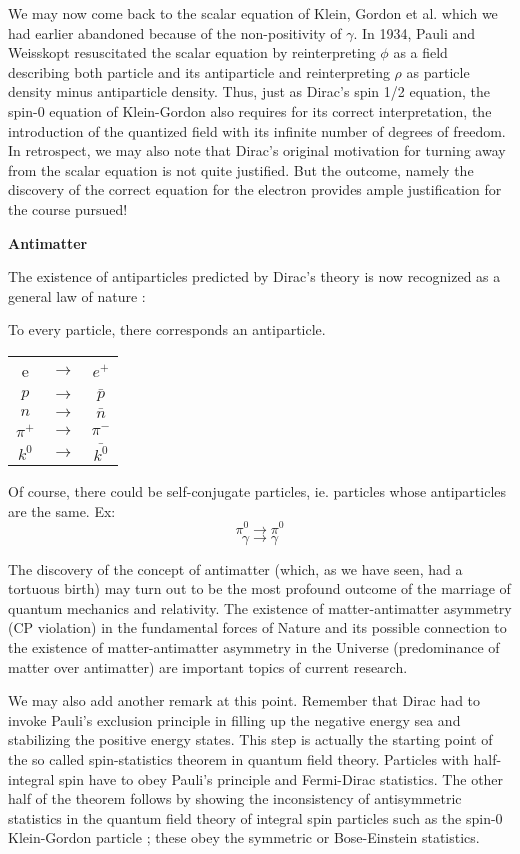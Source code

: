 	We may now come back to the scalar equation of Klein, Gordon et al. which we had earlier abandoned because of the non-positivity of $\gamma$. In 1934, Pauli and Weisskopt resuscitated the scalar equation by reinterpreting $\phi$ as a field describing both particle and its antiparticle and reinterpreting $\rho$ as particle density minus antiparticle density. Thus, just as Dirac’s spin 1/2 equation, the spin-0 equation of Klein-Gordon also requires for its correct interpretation, the introduction of the quantized field with its infinite number of degrees of freedom. In retrospect, we may also note that Dirac’s original motivation for turning away from the scalar equation is not quite justified. But the outcome, namely the discovery of the correct equation for the electron provides ample justification for the course pursued!

\textbf{Antimatter}

The existence of antiparticles predicted by Dirac’s theory is now recognized as a general law of nature :

To every particle, there corresponds an antiparticle.

\begin{center}
\begin{tabular}{|c c c|}
\hline
e &$\rightarrow$ & $e^{+}$\\
$p$ &$\rightarrow$ & $\bar{p}$\\
$n$ &$\rightarrow$ & $\bar{n}$\\
$\pi^{+}$ &$\rightarrow$ & $\pi^{-}$\\
$k^{0}$&$\rightarrow$ & $\bar{k^{0}}$\\
\hline
\end{tabular}
\end{center}

Of course, there could be self-conjugate particles, ie. particles whose antiparticles are the same.
Ex: $$
\pi^{0} \rightarrow \pi^{0}
$$
$$
\gamma \rightarrow \gamma
$$

The discovery of the concept of antimatter (which, as we have seen, had a tortuous birth) may turn out to be the most profound outcome of the marriage of quantum mechanics and relativity. The existence of matter-antimatter asymmetry (CP violation) in the fundamental forces of Nature and its possible connection to the existence of matter-antimatter asymmetry in the Universe (predominance of matter over antimatter) are important topics of current research.

We may also add another remark at this point. Remember that Dirac had to invoke Pauli’s exclusion principle in filling up the negative energy sea and stabilizing the positive energy states. This step is actually the starting point of the so called spin-statistics theorem in quantum field theory. Particles with half-integral spin have to obey Pauli’s principle and Fermi-Dirac statistics. The other half of the theorem follows by showing the inconsistency of antisymmetric statistics in the quantum field theory of integral spin particles such as the spin-0 Klein-Gordon particle ; these obey the symmetric or Bose-Einstein statistics.

